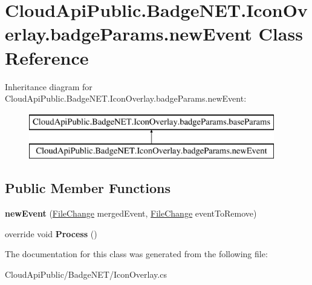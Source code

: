 \hypertarget{class_cloud_api_public_1_1_badge_n_e_t_1_1_icon_overlay_1_1badge_params_1_1new_event}{\section{Cloud\-Api\-Public.\-Badge\-N\-E\-T.\-Icon\-Overlay.\-badge\-Params.\-new\-Event Class Reference}
\label{class_cloud_api_public_1_1_badge_n_e_t_1_1_icon_overlay_1_1badge_params_1_1new_event}
}
Inheritance diagram for Cloud\-Api\-Public.\-Badge\-N\-E\-T.\-Icon\-Overlay.\-badge\-Params.\-new\-Event\-:\begin{figure}[H]
\begin{center}
\leavevmode
\includegraphics[height=2.000000cm]{class_cloud_api_public_1_1_badge_n_e_t_1_1_icon_overlay_1_1badge_params_1_1new_event}
\end{center}
\end{figure}
\subsection*{Public Member Functions}
\begin{DoxyCompactItemize}
\item 
\hypertarget{class_cloud_api_public_1_1_badge_n_e_t_1_1_icon_overlay_1_1badge_params_1_1new_event_ad9c3fa3ddeb58efef9c29d525b3d901f}{{\bfseries new\-Event} (\hyperlink{class_cloud_api_public_1_1_model_1_1_file_change}{File\-Change} merged\-Event, \hyperlink{class_cloud_api_public_1_1_model_1_1_file_change}{File\-Change} event\-To\-Remove)}\label{class_cloud_api_public_1_1_badge_n_e_t_1_1_icon_overlay_1_1badge_params_1_1new_event_ad9c3fa3ddeb58efef9c29d525b3d901f}

\item 
\hypertarget{class_cloud_api_public_1_1_badge_n_e_t_1_1_icon_overlay_1_1badge_params_1_1new_event_af4f277b3f96ca7e5e8add4b0d208cb25}{override void {\bfseries Process} ()}\label{class_cloud_api_public_1_1_badge_n_e_t_1_1_icon_overlay_1_1badge_params_1_1new_event_af4f277b3f96ca7e5e8add4b0d208cb25}

\end{DoxyCompactItemize}


The documentation for this class was generated from the following file\-:\begin{DoxyCompactItemize}
\item 
Cloud\-Api\-Public/\-Badge\-N\-E\-T/Icon\-Overlay.\-cs\end{DoxyCompactItemize}
